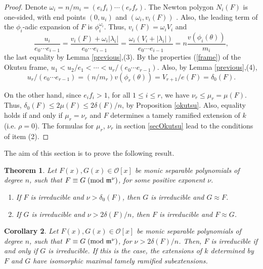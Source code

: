 \documentclass{amsart}
\newtheorem{theorem}{Theorem}[section]
\newtheorem{corollary}[theorem]{Corollary}
\begin{document}
\begin{proof}Denote $\omega_i=n/m_i=(e_if_i)\cdots (e_rf_r)$. The Newton polygon $N_i(F)$ is one-sided, with end points $(0,u_i)$ and $(\omega_i,v_i(F))$ \cite[Lem. 2.17]{HN}. Also, the leading term of the $\phi_i$-adic expansion of $F$ is $\phi_i^{\omega_i}$. Thus, $v_i(F)=\omega_iV_i$ and  
\begin{equation}\label{ui}
\dfrac{u_i}{e_0\cdots e_{i-1}}=\dfrac{v_i(F)+\omega_i|\lambda_i|}{e_0\cdots e_{i-1}}=\dfrac{\omega_i(V_i+|\lambda_i|)}{e_0\cdots e_{i-1}}=n\dfrac{v(\phi_i({\theta}))}{m_i},
\end{equation}
the last equality by Lemma \ref{previous},(3).
By the properties (\ref{frame}) of the Okutsu frame, $u_1<u_2/e_1<\cdots<u_r/(e_0\cdots e_{r-1})$. Also,  by Lemma \ref{previous},(4),
$$u_r/(e_0\cdots e_{r-1})=(n/m_r)v(\phi_r({\theta}))=V_{r+1}/e(F)=\delta_0(F).
$$

On the other hand, since $e_if_i>1$, for all $1\le i\le r$, we have $\nu_r\le \mu_r=\mu(F)$. Thus, $\delta_0(F)\le 2\mu(F)\le 2\delta(F)/n$, by Proposition \ref{okutsu}. Also, equality holds if and only if $\mu_r=\nu_r$ and $F$ determines a tamely ramified extension of $k$ (i.e. $\rho=0$). The formulas for $\mu_r$, $\nu_r$ in section \ref{secOkutsu} lead to the conditions of item (2).   
\end{proof}

The aim of this section is to prove the following result.

\begin{theorem}\label{bound}
Let $F(x),G(x)\in{\mathcal{O}}[x]$ be monic separable polynomials of degree $n$, such that $F\equiv G{\; \mbox{\rm(mod }{{{{\mathfrak m}}^\nu}})}$, for some positive exponent $\nu$.

\begin{enumerate}
\item If $F$ is irreducible and $\nu>\delta_0(F)$, then $G$ is irreducible and $G\approx F$.
\item If $G$ is irreducible and $\nu>2\delta(F)/n$, then $F$ is irreducible and  $F\approx G$.
\end{enumerate}
\end{theorem}

\begin{corollary}\label{testprecision}
Let $F(x),G(x)\in{\mathcal{O}}[x]$ be monic separable polynomials of degree $n$, such that $F\equiv G{\; \mbox{\rm(mod }{{{{\mathfrak m}}^\nu}})}$, for $\nu>2\delta(F)/n$. Then, $F$ is irreducible if and only if $G$ is irreducible. If this is the case, the extensions of $k$ determined by $F$ and $G$ have isomorphic maximal tamely ramified subextensions. 
\end{corollary}
\end{document}
